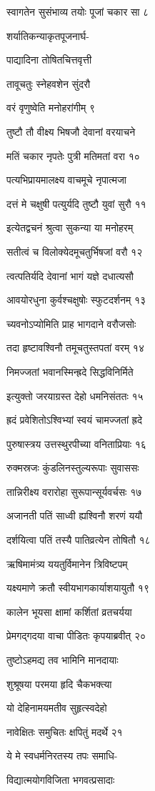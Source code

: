 स्वागतेन सुसंभाव्य तयोः पूजां चकार सा ८

शर्यातिकन्याकृतपूजनार्घ-

पाद्यादिना तोषितचित्तवृत्ती

तावूचतुः स्नेहवशेन सुंदरौ

वरं वृणुष्वेति मनोहरांगीम् ९

तुष्टौ तौ वीक्ष्य भिषजौ देवानां वरयाचने

मतिं चकार नृपतेः पुत्री मतिमतां वरा १०

पत्यभिप्रायमालक्ष्य वाचमूचे नृपात्मजा

दत्तं मे चक्षुषी पत्युर्यदि तुष्टौ युवां सुरौ ११

इत्येतद्वचनं श्रुत्वा सुकन्या या मनोहरम्

सतीत्वं च विलोक्येदमूचतुर्भिषजां वरौ १२

त्वत्पतिर्यदि देवानां भागं यज्ञे दधात्यसौ

आवयोरधुना कुर्वश्चक्षुषोः स्फुटदर्शनम् १३

च्यवनोऽप्योमिति प्राह भागदाने वरौजसोः

तदा हृष्टावश्विनौ तमूचतुस्तपतां वरम् १४

निमज्जतां भवानस्मिन्ह्रदे सिद्धविनिर्मिते

इत्युक्तो जरयाग्रस्त देहो धमनिसंततः १५

ह्रदं प्रवेशितोऽश्विभ्यां स्वयं चामज्जतां ह्रदे

पुरुषास्त्रय उत्तस्थुरपीच्या वनिताप्रियाः १६

रुक्मस्रजः कुंडलिनस्तुल्यरूपाः सुवाससः

तान्निरीक्ष्य वरारोहा सुरूपान्सूर्यवर्चसः १७

अजानती पतिं साध्वी ह्यश्विनौ शरणं ययौ

दर्शयित्वा पतिं तस्यै पातिव्रत्येन तोषितौ १८

ऋषिमामंत्र्य ययतुर्विमानेन त्रिविष्टपम्

यक्ष्यमाणे क्रतौ स्वीयभागकार्याशयायुतौ १९

कालेन भूयसा क्षामां कर्शितां व्रतचर्यया

प्रेमगद्गदया वाचा पीडितः कृपयाब्रवीत् २०

तुष्टोऽहमद्य तव भामिनि मानदायाः

शुश्रूषया परमया हृदि चैकभक्त्या

यो देहिनामयमतीव सुहृत्स्वदेहो

नावेक्षितः समुचितः क्षपितुं मदर्थे २१

ये मे स्वधर्मनिरतस्य तपः समाधि-

विद्यात्मयोगविजिता भगवत्प्रसादाः

